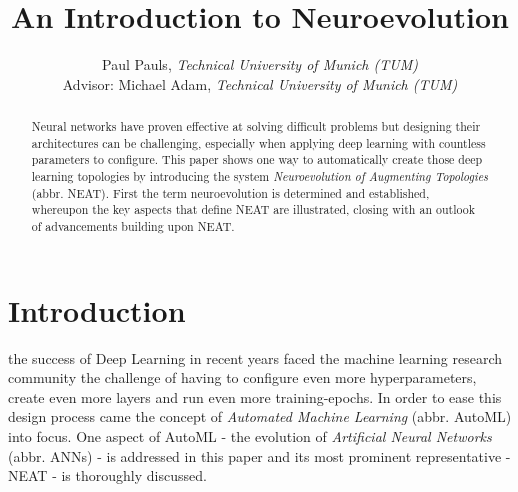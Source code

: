 \documentclass[journal, a4paper]{IEEEtran}
\begin{document}
\title{An Introduction to Neuroevolution}
\author{Paul Pauls, \textit{Technical University of Munich (TUM)}\\
        Advisor: Michael Adam, \textit{Technical University of Munich (TUM)}}
\maketitle




\begin{abstract}
    Neural networks have proven effective at solving difficult problems but designing their architectures can be challenging, especially when applying deep learning with countless parameters to configure. This paper shows one way to automatically create those deep learning topologies by introducing the system \textit{Neuroevolution of Augmenting Topologies} (abbr. NEAT). First the term neuroevolution is determined and established, whereupon the key aspects that define NEAT are illustrated, closing with an outlook of advancements building upon NEAT.
\end{abstract}




\section{Introduction}

 the success of Deep Learning in recent years \cite{kri12, cir12, sch14} faced the machine learning research community the challenge of having to configure even more hyperparameters, create even more layers and run even more training-epochs. In order to ease this design process came the concept of \textit{Automated Machine Learning} (abbr. AutoML) into focus. One aspect of AutoML - the evolution of \textit{Artificial Neural Networks} (abbr. ANNs) - is addressed in this paper and its most prominent representative - NEAT - is thoroughly discussed. 
\end{document}
